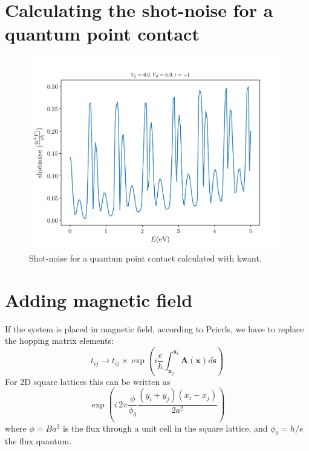 \documentclass[12pt]{article}
\numberwithin{equation}{section}
\begin{document}
\newpage
\section*{Calculating the shot-noise for a quantum point contact}
\begin{figure}[h!]
    \begin{center}
        \includegraphics[height=0.7\textheight]{./media/2deg_shotnoise_W40_L20_VL6_0_VS6_0.png}
        \caption{Shot-noise for a quantum point contact calculated with kwant.}
        \label{fig:2deg_shotnoise_W40_L20_VL6.0_VS6.0.png}
    \end{center}
\end{figure}

\newpage 
\section*{Adding magnetic field}
If the system is placed in magnetic field, according to Peierls, we have to replace the hopping matrix elements:
\begin{equation*}
  t_{ij} \rightarrow t_{ij} \times \exp\left(i \frac{e}{\hbar} \int_{\mathbf{x}_j}^{\mathbf{x}_i} \mathbf{A}(\mathbf{x}) d\mathbf{s}\right)
\end{equation*}
For 2D square lattices this can be written as 
\begin{equation*}
  \exp\left(i\, 2 \pi \frac{\phi}{\phi_0} \frac{(y_i + y_j)(x_i-x_j)}{2a^2} \right)  
\end{equation*}
where $\phi = B a^2$ is the flux through a unit cell in the square lattice, and $\phi_0 = h/e$ the flux quantum. 
\end{document}
